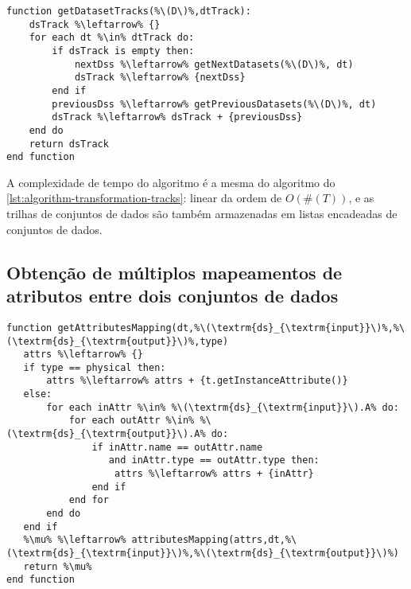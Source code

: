 
\begin{minipage}[c]{0.95\textwidth}
\begin{lstlisting}[language=pseudocode,label={lst:algorithm-dataset-tracks},caption={[Detecção das trilhas de conjuntos de dados]Detecção do rastro do fluxo de dados no nível de trilhas de conjuntos de dados.}]
function getDatasetTracks(%\(D\)%,dtTrack):
    dsTrack %\leftarrow% {}
    for each dt %\in% dtTrack do:
        if dsTrack is empty then:
            nextDss %\leftarrow% getNextDatasets(%\(D\)%, dt)
            dsTrack %\leftarrow% {nextDss}
        end if
        previousDss %\leftarrow% getPreviousDatasets(%\(D\)%, dt)
        dsTrack %\leftarrow% dsTrack + {previousDss}
    end do
    return dsTrack
end function
\end{lstlisting}
\end{minipage}

A complexidade de tempo do algoritmo é a mesma do algoritmo do \autoref{lst:algorithm-transformation-tracks}: linear da ordem de \( O(\#(T)) \), e as trilhas de conjuntos de dados são também armazenadas em listas encadeadas de conjuntos de dados.

\subsection{Obtenção de múltiplos mapeamentos de atributos entre dois conjuntos de dados}


\begin{minipage}[c]{0.95\textwidth}
\begin{lstlisting}[language=pseudocode,label={lst:algorithm-attribute-mappings},caption={[Obtenção de múltiplos mapeamentos de atributos]Obtenção de múltiplos mapeamentos de atributos entre dois conjuntos de dados.}]
function getAttributesMapping(dt,%\(\textrm{ds}_{\textrm{input}}\)%,%\(\textrm{ds}_{\textrm{output}}\)%,type)
   attrs %\leftarrow% {}
   if type == physical then:
       attrs %\leftarrow% attrs + {t.getInstanceAttribute()}
   else:
       for each inAttr %\in% %\(\textrm{ds}_{\textrm{input}}\).A% do:
           for each outAttr %\in% %\(\textrm{ds}_{\textrm{output}}\).A% do:
               if inAttr.name == outAttr.name
                  and inAttr.type == outAttr.type then:
                   attrs %\leftarrow% attrs + {inAttr}
               end if
           end for
       end do
   end if
   %\mu% %\leftarrow% attributesMapping(attrs,dt,%\(\textrm{ds}_{\textrm{input}}\)%,%\(\textrm{ds}_{\textrm{output}}\)%)
   return %\mu%
end function
\end{lstlisting}
\end{minipage}


